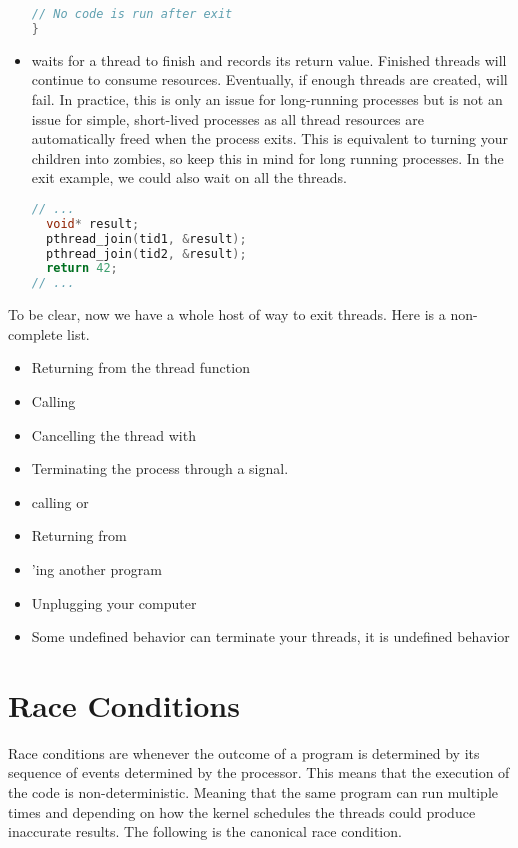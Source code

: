 \begin{itemize}
\begin{lstlisting}[language=C]
  // No code is run after exit
}
\end{lstlisting}

\item {} waits for a thread to finish and records its return value.
Finished threads will continue to consume resources.
Eventually, if enough threads are created,  will fail.
In practice, this is only an issue for long-running processes but is not an issue for simple, short-lived processes as all thread resources are automatically freed when the process exits.
This is equivalent to turning your children into zombies, so keep this in mind for long running processes. In the exit example, we could also wait on all the threads.

\begin{lstlisting}[language=C]
// ...
  void* result;
  pthread_join(tid1, &result);
  pthread_join(tid2, &result);
  return 42;
// ...
\end{lstlisting}


\end{itemize}

To be clear, now we have a whole host of way to exit threads.
Here is a non-complete list.

\begin{itemize}
\item Returning from the thread function
\item Calling 
\item Cancelling the thread with 
\item Terminating the process through a signal.
\item calling  or 
\item Returning from 
\item {}'ing another program
\item Unplugging your computer
\item Some undefined behavior can terminate your threads, it is undefined behavior
\end{itemize}

\section{Race Conditions}

Race conditions are whenever the outcome of a program is determined by its sequence of events determined by the processor.
This means that the execution of the code is non-deterministic.
Meaning that the same program can run multiple times and depending on how the kernel schedules the threads could produce inaccurate results.
The following is the canonical race condition.

